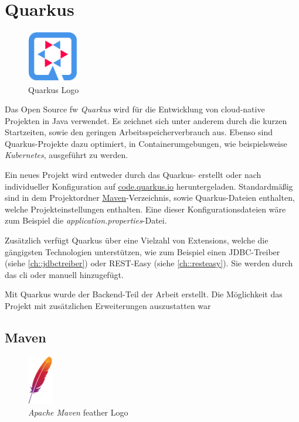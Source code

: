 \section{Quarkus}
\begin{figure}
    \begin{center}
      \includegraphics[width=0.2\textwidth]{pics/logos/quarkus.png}
     \caption{Quarkus Logo}
    \end{center}
  \end{figure}
Das Open Source \gls{fw} \emph{Quarkus} wird für die Entwicklung von cloud-native Projekten in Java verwendet. 
Es zeichnet sich unter anderem durch die kurzen Startzeiten, sowie den geringen Arbeitsspeicherverbrauch aus. 
Ebenso sind Quarkus-Projekte dazu optimiert, in Containerumgebungen, wie beispielsweise \emph{Kubernetes}, ausgeführt zu werden.
\cite{QuarkusHomepage, QuarkusAbout}

Ein neues Projekt wird entweder durch das Quarkus- erstellt oder nach individueller Konfiguration auf \href{https://code.quarkus.io}{code.quarkus.io} heruntergeladen. 
Standardmäßig sind in dem Projektordner \hyperref[ch::MavenTool]{Maven}-Verzeichnis, sowie Quarkus-Dateien enthalten, welche Projekteinstellungen enthalten. 
Eine dieser Konfigurationsdateien wäre zum Beispiel die \emph{application.properties}-Datei. 
\cite{QuarkusAbout, QuarkusFirstApplication}

Zusätzlich verfügt Quarkus über eine Vielzahl von Extensions, welche die gängigsten Technologien unterstützen, wie zum Beispiel einen JDBC-Treiber (siehe \ref{ch::jdbctreiber}) oder REST-Easy (siehe \ref{ch::resteasy}). 
Sie werden durch das \gls{cli} oder manuell hinzugefügt. 
\cite{QuarkusAbout, QuarkusFirstApplication}

Mit Quarkus wurde der Backend-Teil der Arbeit erstellt. 
Die Möglichkeit das Projekt mit zusätzlichen Erweiterungen auszustatten war 

\subsection{Maven}
\label{ch::MavenTool}
\begin{figure}
    \begin{center}
        \includegraphics[width=0.1\textwidth]{pics/logos/asf.jpg}
        \caption{\emph{Apache Maven} feather Logo}
    \end{center}
\end{figure}

